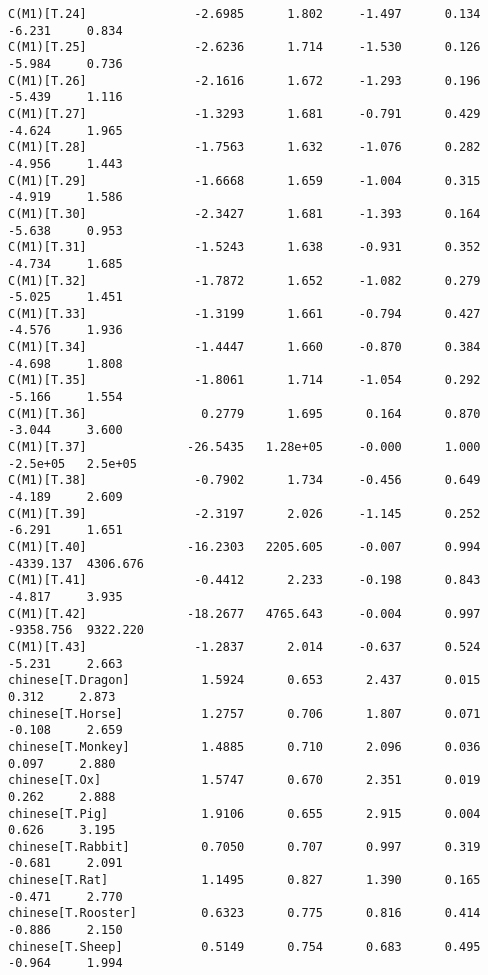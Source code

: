 \documentclass[12pt,fleqn]{article}\usepackage{../common}
\begin{document}
\begin{verbatim}
C(M1)[T.24]               -2.6985      1.802     -1.497      0.134        -6.231     0.834
C(M1)[T.25]               -2.6236      1.714     -1.530      0.126        -5.984     0.736
C(M1)[T.26]               -2.1616      1.672     -1.293      0.196        -5.439     1.116
C(M1)[T.27]               -1.3293      1.681     -0.791      0.429        -4.624     1.965
C(M1)[T.28]               -1.7563      1.632     -1.076      0.282        -4.956     1.443
C(M1)[T.29]               -1.6668      1.659     -1.004      0.315        -4.919     1.586
C(M1)[T.30]               -2.3427      1.681     -1.393      0.164        -5.638     0.953
C(M1)[T.31]               -1.5243      1.638     -0.931      0.352        -4.734     1.685
C(M1)[T.32]               -1.7872      1.652     -1.082      0.279        -5.025     1.451
C(M1)[T.33]               -1.3199      1.661     -0.794      0.427        -4.576     1.936
C(M1)[T.34]               -1.4447      1.660     -0.870      0.384        -4.698     1.808
C(M1)[T.35]               -1.8061      1.714     -1.054      0.292        -5.166     1.554
C(M1)[T.36]                0.2779      1.695      0.164      0.870        -3.044     3.600
C(M1)[T.37]              -26.5435   1.28e+05     -0.000      1.000      -2.5e+05   2.5e+05
C(M1)[T.38]               -0.7902      1.734     -0.456      0.649        -4.189     2.609
C(M1)[T.39]               -2.3197      2.026     -1.145      0.252        -6.291     1.651
C(M1)[T.40]              -16.2303   2205.605     -0.007      0.994     -4339.137  4306.676
C(M1)[T.41]               -0.4412      2.233     -0.198      0.843        -4.817     3.935
C(M1)[T.42]              -18.2677   4765.643     -0.004      0.997     -9358.756  9322.220
C(M1)[T.43]               -1.2837      2.014     -0.637      0.524        -5.231     2.663
chinese[T.Dragon]          1.5924      0.653      2.437      0.015         0.312     2.873
chinese[T.Horse]           1.2757      0.706      1.807      0.071        -0.108     2.659
chinese[T.Monkey]          1.4885      0.710      2.096      0.036         0.097     2.880
chinese[T.Ox]              1.5747      0.670      2.351      0.019         0.262     2.888
chinese[T.Pig]             1.9106      0.655      2.915      0.004         0.626     3.195
chinese[T.Rabbit]          0.7050      0.707      0.997      0.319        -0.681     2.091
chinese[T.Rat]             1.1495      0.827      1.390      0.165        -0.471     2.770
chinese[T.Rooster]         0.6323      0.775      0.816      0.414        -0.886     2.150
chinese[T.Sheep]           0.5149      0.754      0.683      0.495        -0.964     1.994

\end{verbatim}
\end{document}
